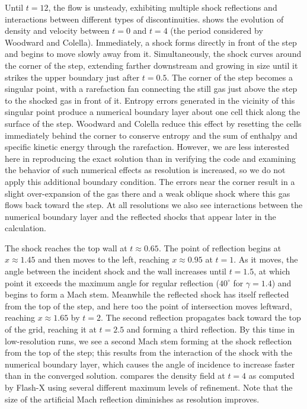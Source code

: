 Until $t=12$, the flow is unsteady, exhibiting multiple shock
reflections and interactions between different types of
discontinuities.  shows the evolution of
density and velocity between $t=0$ and $t=4$ (the period considered
by Woodward and Colella). Immediately, a shock forms directly in
front of the step and begins to move slowly away from it.
Simultaneously, the shock curves around the corner of the step,
extending farther downstream and growing in size until it strikes
the upper boundary just after $t=0.5$. The corner of the step
becomes a singular point, with a rarefaction fan connecting the
still gas just above the step to the shocked gas in front of it.
Entropy errors generated in the vicinity of this singular point
produce a numerical boundary layer about one cell thick along the
surface of the step. Woodward and Colella reduce this effect by
resetting the cells immediately behind the corner to conserve
entropy and the sum of enthalpy and specific kinetic energy through
the rarefaction. However, we are less interested here in reproducing
the exact solution than in verifying the code and examining the
behavior of such numerical effects as resolution is increased, so we
do not apply this additional boundary condition. The errors near the
corner result in a slight over-expansion of the gas there and a weak
oblique shock where this gas flows back toward the step. At all
resolutions we also see interactions between the numerical boundary
layer and the reflected shocks that appear later in the calculation.

The shock reaches the top wall at $t\approx 0.65$.  The point of
reflection begins at $x\approx 1.45$  and then moves to the left,
reaching $x\approx 0.95$ at $t=1$. As it moves, the angle between
the incident shock and the wall increases until $t=1.5$, at which
point it exceeds the maximum angle for regular reflection
($40^\circ$ for $\gamma=1.4$) and begins to form a Mach stem.
Meanwhile the reflected shock has itself reflected from the top of
the step, and here too the point of intersection moves leftward,
reaching $x\approx 1.65$ by $t=2$. The second reflection propagates
back toward the top of the grid, reaching it at $t=2.5$ and forming
a third reflection. By this time in low-resolution runs, we see a
second Mach stem forming at the shock reflection from the top of the
step; this results from the interaction of the shock with the
numerical boundary layer, which causes the angle of incidence to
increase faster than in the converged solution.  compares the density field at $t=4$ as computed
by Flash-X using several different maximum levels of refinement. Note
that the size of the artificial Mach reflection diminishes as
resolution improves.

